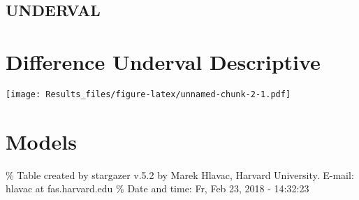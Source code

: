 \documentclass[]{article}
\newenvironment{Shaded}{\begin{snugshade}}{\end{snugshade}}
\newcommand{\KeywordTok}[1]{\textcolor[rgb]{0.13,0.29,0.53}{\textbf{#1}}}
\newcommand{\DataTypeTok}[1]{\textcolor[rgb]{0.13,0.29,0.53}{#1}}
\newcommand{\DecValTok}[1]{\textcolor[rgb]{0.00,0.00,0.81}{#1}}
\newcommand{\FloatTok}[1]{\textcolor[rgb]{0.00,0.00,0.81}{#1}}
\newcommand{\OperatorTok}[1]{\textcolor[rgb]{0.81,0.36,0.00}{\textbf{#1}}}
\newcommand{\NormalTok}[1]{#1}
\begin{document}
\subsection{UNDERVAL}\label{underval}

\section{Difference Underval
Descriptive}\label{difference-underval-descriptive}

\begin{Shaded}
\end{Shaded}

\texttt{[image: Results\_files/figure-latex/unnamed-chunk-2-1.pdf]}

\section{Models}\label{models}

\% Table created by stargazer v.5.2 by Marek Hlavac, Harvard University.
E-mail: hlavac at fas.harvard.edu \% Date and time: Fr, Feb 23, 2018 -
14:32:23
\end{document}
